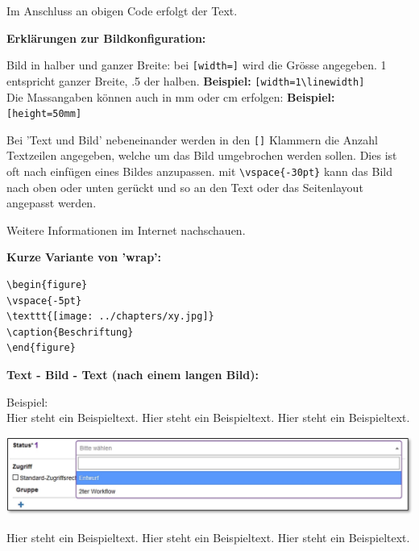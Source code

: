 Im Anschluss an obigen Code erfolgt der Text.

\vspace{\baselineskip}

\textbf{Erklärungen zur Bildkonfiguration:}

\begin{compactitem}
	\item Bild in halber und ganzer Breite: bei \verb+[width=]+ wird die Grösse angegeben. 1 entspricht ganzer Breite, .5 der halben. \textbf{Beispiel:} \verb+[width=1\linewidth]+\\
	Die Massangaben können auch in mm oder cm erfolgen: \textbf{Beispiel:} \verb+[height=50mm]+
	\item Bei 'Text und Bild' nebeneinander werden in den \verb+[]+ Klammern die Anzahl Textzeilen angegeben, welche um das Bild umgebrochen werden sollen. Dies ist oft nach einfügen eines Bildes anzupassen. mit \verb+\vspace{-30pt}+ kann das Bild nach oben oder unten gerückt und so an den Text oder das Seitenlayout angepasst werden.
	\item Weitere Informationen im Internet nachschauen.
\end{compactitem}

\vspace{\baselineskip}

\textbf{Kurze Variante von 'wrap':}

\begin{verbatim}
\begin{figure}
\vspace{-5pt}
\texttt{[image: ../chapters/xy.jpg]}
\caption{Beschriftung}
\end{figure}
\end{verbatim}

\pagebreak
\textbf{Text - Bild - Text (nach einem langen Bild):}

Beispiel:\\
Hier steht ein Beispieltext. Hier steht ein Beispieltext. Hier steht ein Beispieltext.

\begin{center}
\hspace{-15pt}   
\includegraphics[width=.4\linewidth]{../pictures/Printscreen.jpg}
\end{center}

Hier steht ein Beispieltext. Hier steht ein Beispieltext. Hier steht ein Beispieltext.

